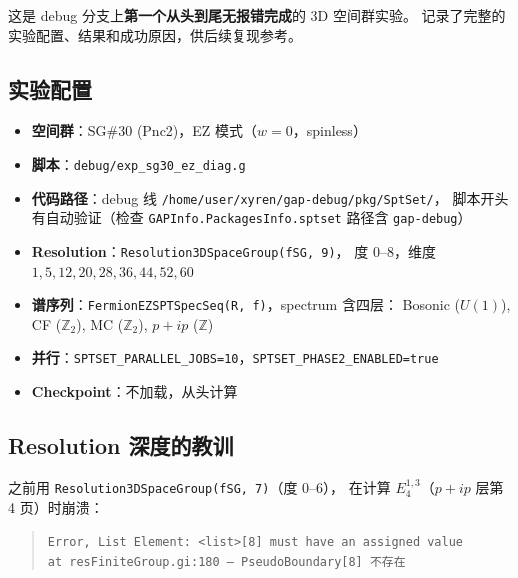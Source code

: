 \documentclass[a4paper,fontset=ubuntu,12pt]{ctexart}
\begin{document}
这是 debug 分支上\textbf{第一个从头到尾无报错完成}的 3D 空间群实验。
记录了完整的实验配置、结果和成功原因，供后续复现参考。

\subsection{实验配置}

\begin{itemize}
\item \textbf{空间群}：SG\#30 (Pnc2)，EZ 模式（$w=0$，spinless）
\item \textbf{脚本}：\texttt{debug/exp\_sg30\_ez\_diag.g}
\item \textbf{代码路径}：debug 线 \texttt{/home/user/xyren/gap-debug/pkg/SptSet/}，
      脚本开头有自动验证（检查 \texttt{GAPInfo.PackagesInfo.sptset} 路径含 \texttt{gap-debug}）
\item \textbf{Resolution}：\texttt{Resolution3DSpaceGroup(fSG, 9)}，
      度 0--8，维度 $1, 5, 12, 20, 28, 36, 44, 52, 60$
\item \textbf{谱序列}：\texttt{FermionEZSPTSpecSeq(R, f)}，spectrum 含四层：
      Bosonic ($U(1)$), CF ($\mathbb{Z}_2$), MC ($\mathbb{Z}_2$), $p{+}ip$ ($\mathbb{Z}$)
\item \textbf{并行}：\texttt{SPTSET\_PARALLEL\_JOBS=10}，\texttt{SPTSET\_PHASE2\_ENABLED=true}
\item \textbf{Checkpoint}：不加载，从头计算
\end{itemize}

\subsection{Resolution 深度的教训}

之前用 \texttt{Resolution3DSpaceGroup(fSG, 7)}（度 0--6），
在计算 $E^{1,3}_4$（$p{+}ip$ 层第 4 页）时崩溃：
\begin{quote}
\texttt{Error, List Element: <list>[8] must have an assigned value}\\
\texttt{at resFiniteGroup.gi:180 --- PseudoBoundary[8] 不存在}
\end{quote}
\end{document}
